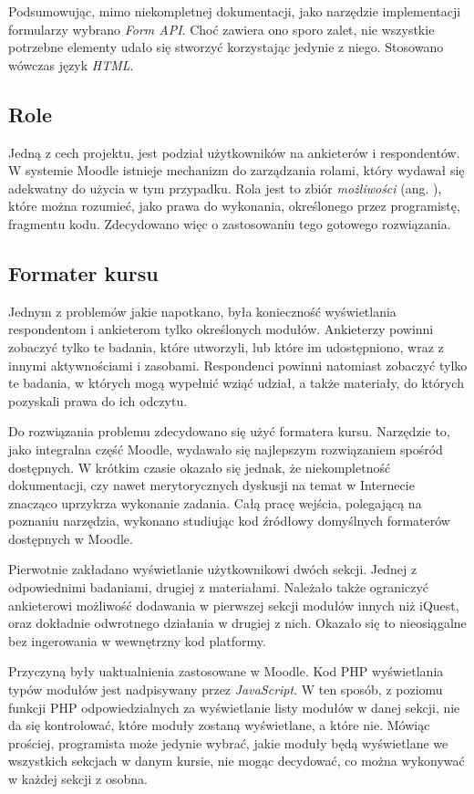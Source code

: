 Podsumowując, mimo niekompletnej dokumentacji, jako narzędzie implementacji formularzy wybrano \textit{Form API}. Choć zawiera ono sporo zalet, nie wszystkie potrzebne elementy udało się stworzyć korzystając jedynie z niego. Stosowano wówczas język \textit{HTML}. 

\subsection{Role}
\label{Chapter626}

Jedną z cech projektu, jest podział użytkowników na ankieterów i respondentów. W systemie Moodle istnieje mechanizm do zarządzania rolami, który wydawał się adekwatny do użycia w tym przypadku. Rola jest to zbiór \textit{możliwości} (ang. ), które można rozumieć, jako prawa do wykonania, określonego przez programistę, fragmentu kodu. Zdecydowano więc o zastosowaniu tego gotowego rozwiązania.

\subsection{Formater kursu}
\label{Chapter627}

Jednym z problemów jakie napotkano, była konieczność wyświetlania respondentom i ankieterom tylko określonych modułów. Ankieterzy powinni zobaczyć tylko te badania, które utworzyli, lub które im udostępniono, wraz z innymi aktywnościami i zasobami. Respondenci powinni natomiast zobaczyć tylko te badania, w których mogą wypełnić wziąć udział, a także materiały, do których pozyskali prawa do ich odczytu.

Do rozwiązania problemu zdecydowano się użyć formatera kursu. Narzędzie to, jako integralna część Moodle, wydawało się najlepszym rozwiązaniem spośród dostępnych. W krótkim czasie okazało się jednak, że niekompletność dokumentacji, czy nawet merytorycznych dyskusji na temat w Internecie znacząco uprzykrza wykonanie zadania. Całą pracę wejścia, polegającą na poznaniu narzędzia, wykonano studiując kod źródłowy domyślnych formaterów dostępnych w Moodle.

Pierwotnie zakładano wyświetlanie użytkownikowi dwóch sekcji. Jednej z odpowiednimi badaniami, drugiej z materiałami. Należało także ograniczyć ankieterowi możliwość dodawania w pierwszej sekcji modułów innych niż iQuest, oraz dokładnie odwrotnego działania w drugiej z nich. Okazało się to nieosiągalne bez ingerowania w wewnętrzny kod platformy.

Przyczyną były uaktualnienia zastosowane w Moodle. Kod PHP wyświetlania typów modułów jest nadpisywany przez \textit{JavaScript}. W ten sposób, z poziomu funkcji PHP odpowiedzialnych za wyświetlanie listy modułów w danej sekcji, nie da się kontrolować, które moduły zostaną wyświetlane, a które nie. Mówiąc prościej, programista może jedynie wybrać, jakie moduły będą wyświetlane we wszystkich sekcjach w danym kursie, nie mogąc decydować, co można wykonywać w każdej sekcji z osobna.

